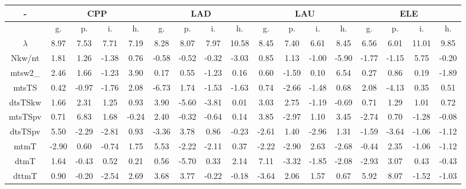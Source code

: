 \documentclass[%
 aip,
 jmp,%
 amsmath,amssymb,
 reprint,%
]{revtex4-1}
\begin{document}
\begin{table}
\begin{tabular}{|c|| c|c|c|c|| c|c|c|c|| c|c|c|c|| c|c|c|c|}\hline
  \centering
    \scriptsize
\setlength{\tabcolsep}{.26667em}
-\-  & \multicolumn{4}{c|}{CPP} & \multicolumn{4}{c|}{LAD} & \multicolumn{4}{c|}{LAU} & \multicolumn{4}{c|}{ELE} \\ \hline\hline
 & g. & p. & i. & h. &     g. & p. & i. & h. &    g. & p. & i. & h. &    g. & p. & i. & h. \\\hline
$\lambda$ & 8.97 & 7.53 & 7.71 & 7.19 & 8.28 & 8.07 & 7.97 & 10.58 & 8.45 & 7.40 & 6.61 & 8.45 & 6.56 & 6.01 & 11.01 & 9.85 \\\hline
Nkw/nt & 1.81 & 1.26 & -1.38 & 0.76 & -0.58 & -0.52 & -0.32 & -3.03 & 0.85 & 1.13 & -1.00 & -5.90 & -1.77 & -1.15 & 5.75 & -0.20 \\\hline
mtsw2\_ & 2.46 & 1.66 & -1.23 & 3.90 & 0.17 & 0.55 & -1.23 & 0.16 & 0.60 & -1.59 & 0.10 & 6.54 & 0.27 & 0.86 & 0.19 & -1.89 \\\hline
mtsTS & 0.42 & -0.97 & -1.76 & 2.08 & -6.73 & 1.74 & -1.53 & -1.63 & 0.74 & -2.66 & -1.48 & 0.68 & 2.08 & -4.13 & 0.35 & 0.51 \\\hline
dtsTSkw & 1.66 & 2.31 & 1.25 & 0.93 & 3.90 & -5.60 & -3.81 & 0.01 & 3.03 & 2.75 & -1.19 & -0.69 & 0.71 & 1.29 & 1.01 & 0.72 \\\hline
mtsTSpv & 0.71 & 6.83 & 1.68 & -0.24 & 2.40 & -0.32 & -0.64 & 0.14 & 3.85 & -2.97 & 1.10 & 3.45 & -2.74 & 0.70 & -1.28 & -0.08 \\\hline
dtsTSpv & 5.50 & -2.29 & -2.81 & 0.93 & -3.36 & 3.78 & 0.86 & -0.23 & -2.61 & 1.40 & -2.96 & 1.31 & -1.59 & -3.64 & -1.06 & -1.12 \\\hline
mtmT & -2.90 & 0.60 & -0.74 & 1.75 & 5.53 & -2.22 & -2.11 & 0.37 & -2.22 & -2.90 & 2.63 & -2.68 & -0.44 & 2.35 & -1.06 & -1.12 \\\hline
dtmT & 1.64 & -0.43 & 0.52 & 0.21 & 0.56 & -5.70 & 0.33 & 2.14 & 7.11 & -3.32 & -1.85 & -2.08 & -2.93 & 3.07 & 0.43 & -0.43 \\\hline
dttmT & 0.90 & -0.20 & -2.54 & 2.69 & 3.68 & 3.77 & -0.22 & -0.18 & -3.64 & 2.06 & 1.57 & 0.67 & 5.92 & 8.07 & -1.52 & -1.03 \\\hline

\end{tabular}
\end{table}
\end{document}
